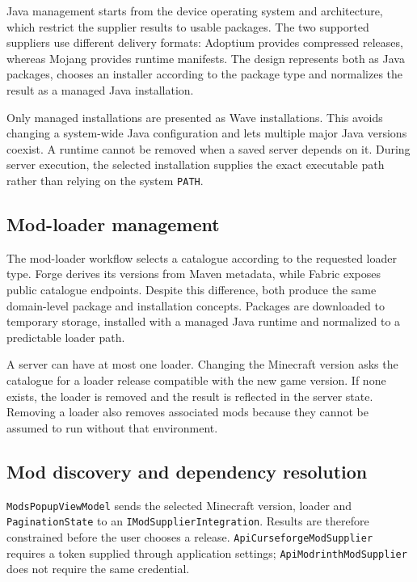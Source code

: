 Java management starts from the device operating system and architecture, which restrict the supplier results to usable packages. The two supported suppliers use different delivery formats: Adoptium provides compressed releases, whereas Mojang provides runtime manifests. The design represents both as Java packages, chooses an installer according to the package type and normalizes the result as a managed Java installation.

Only managed installations are presented as Wave installations. This avoids changing a system-wide Java configuration and lets multiple major Java versions coexist. A runtime cannot be removed when a saved server depends on it. During server execution, the selected installation supplies the exact executable path rather than relying on the system \texttt{PATH}.

\subsection{Mod-loader management}

The mod-loader workflow selects a catalogue according to the requested loader type. Forge derives its versions from Maven metadata, while Fabric exposes public catalogue endpoints. Despite this difference, both produce the same domain-level package and installation concepts. Packages are downloaded to temporary storage, installed with a managed Java runtime and normalized to a predictable loader path.

A server can have at most one loader. Changing the Minecraft version asks the catalogue for a loader release compatible with the new game version. If none exists, the loader is removed and the result is reflected in the server state. Removing a loader also removes associated mods because they cannot be assumed to run without that environment.

\subsection{Mod discovery and dependency resolution}

\texttt{ModsPopupViewModel} sends the selected Minecraft version, loader and \texttt{PaginationState} to an \texttt{IModSupplierIntegration}. Results are therefore constrained before the user chooses a release. \texttt{ApiCurseforgeModSupplier} requires a token supplied through application settings; \texttt{ApiModrinthModSupplier} does not require the same credential.

